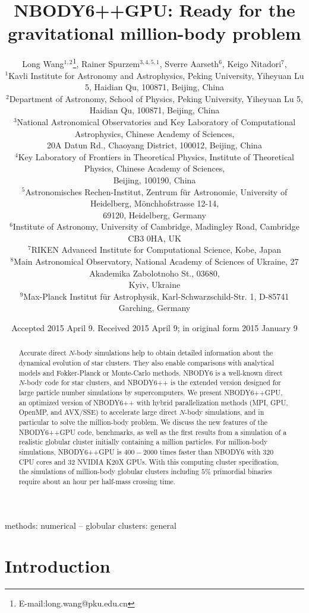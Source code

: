 \documentclass[usenatbib,aas_macros]{mn2e}
\title[NBODY6++GPU: Ready for the million-body problem]{NBODY6++GPU: Ready for the gravitational million-body problem}
\author[L. Wang et al.]{Long Wang$^{1,2}$\thanks{E-mail:long.wang@pku.edu.cn}, Rainer Spurzem$^{3,4,5,1}$, Sverre Aarseth$^{6}$, Keigo Nitadori$^{7}$,
\newauthor{Peter Berczik$^{3,4,5,8}$, M.B.N. Kouwenhoven$^{1,2}$, Thorsten Naab$^{9}$}\\
  $^{1}$Kavli Institute for Astronomy and Astrophysics, Peking University, Yiheyuan Lu 5, Haidian Qu, 100871, Beijing, China\\
  $^{2}$Department of Astronomy, School of Physics, Peking University, Yiheyuan Lu 5, Haidian Qu, 100871, Beijing, China\\
  $^{3}$National Astronomical Observatories and Key Laboratory of Computational Astrophysics, Chinese Academy of Sciences, \\
  20A Datun Rd., Chaoyang District, 100012, Beijing, China\\ 
  $^{4}$Key Laboratory of Frontiers in Theoretical Physics, Institute of Theoretical Physics, Chinese Academy of Sciences, \\
Beijing, 100190, China \\
  $^{5}$Astronomisches Rechen-Institut, Zentrum f\"ur Astronomie, University of Heidelberg, M\"onchhofstrasse 12-14, \\
69120, Heidelberg, Germany\\
  $^{6}$Institute of Astronomy, University of Cambridge, Madingley Road, Cambridge CB3 0HA, UK \\
  $^{7}$RIKEN Advanced Institute for Computational Science‏, Kobe, Japan‏\\
  $^{8}$Main Astronomical Observatory, National Academy of Sciences of Ukraine, 27 Akademika Zabolotnoho St., 03680, \\
Kyiv, Ukraine\\
  $^{9}$Max-Planck Institut f\"ur Astrophysik, Karl-Schwarzschild-Str. 1, D-85741 Garching, Germany \\
}
\def\nbody{NBODY6 }
\def\nbodypp{NBODY6++ }
\def\nbodyppgpu{NBODY6++GPU }
\def\nb{$N$-body }
\begin{document}
\date{Accepted 2015 April 9. Received 2015 April 9; in original form 2015 January 9}

  

\maketitle

\label{firstpage}

\begin{abstract}
Accurate direct \nb simulations help to obtain detailed information about the dynamical evolution of star clusters.
They also enable comparisons with analytical models and Fokker-Planck or Monte-Carlo methods. 
\nbody is a well-known direct \nb code for star clusters,
 and \nbodypp is the extended version designed for large particle number simulations by supercomputers. 
We present NBODY6++GPU, an optimized version of \nbodypp with hybrid parallelization methods (MPI, GPU, OpenMP, and AVX/SSE) to accelerate large direct \nb simulations, and in particular to solve the million-body problem. 
We discuss the new features of the \nbodyppgpu code, benchmarks, as well as the first results from a simulation of a realistic globular cluster initially containing a million particles.
For million-body simulations, \nbodyppgpu is $400-2000$ times faster than \nbody with 320 CPU cores and 32 NVIDIA K20X GPUs. 
With this computing cluster specification, the simulations of million-body globular clusters including $5\%$ primordial binaries require about an hour per half-mass crossing time.

\end{abstract}

\begin{keywords}
methods: numerical -- globular clusters: general 
\end{keywords}

\section{Introduction}
\end{document}
